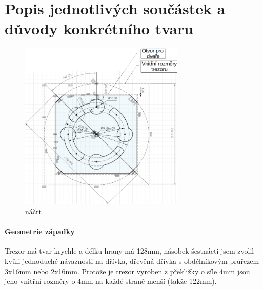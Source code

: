 \section{Popis jednotlivých součástek a důvody konkrétního tvaru}

\begin{figure}
    \includegraphics[width=0.7\textwidth]{kapitoly/obrazky/M3/geometrie_zapadky.png}
    \caption{náčrt}
    \label{fig:M3-geometrie-zapadky}
\end{figure}

\paragraph{Geometrie západky}
Trezor má tvar krychle a délku hrany má 128mm, násobek šestnácti jsem zvolil kvůli jednoduché návaznosti na dřívka, dřevěná dřívka s obdélníkovým průřezem 3x16mm nebo 2x16mm. 
Protože je trezor vyroben z překližky o síle 4mm jsou jeho vnitřní rozměry o 4mm na každé straně menší (takže 122mm). 